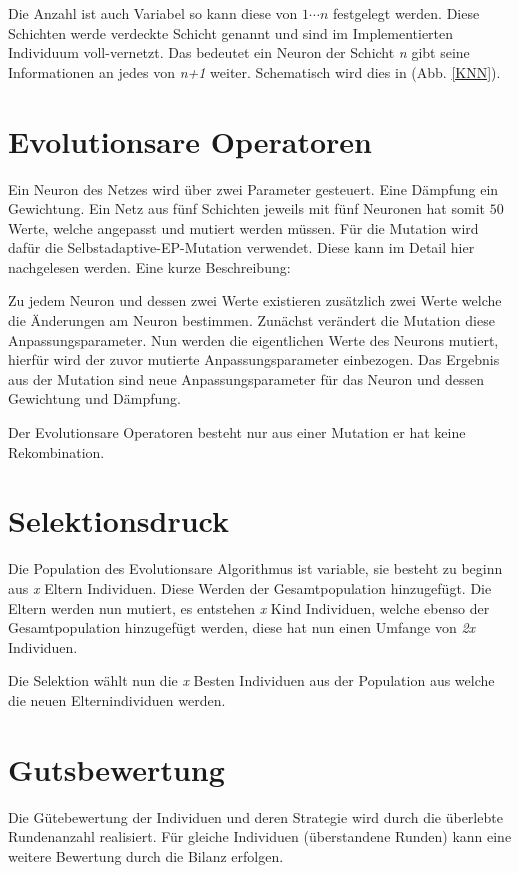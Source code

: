 Die Anzahl ist auch Variabel so kann diese von $1 \cdots n$ festgelegt werden. Diese Schichten werde verdeckte Schicht genannt und sind im Implementierten Individuum voll-vernetzt. Das bedeutet ein Neuron der Schicht \textit{n} gibt seine Informationen an jedes von \textit{n+1} weiter. Schematisch wird dies in (Abb. \ref{KNN}).

\section{Evolutionsare Operatoren}
Ein Neuron des Netzes wird über zwei Parameter gesteuert. Eine Dämpfung ein Gewichtung. Ein Netz aus fünf Schichten jeweils mit fünf Neuronen hat somit $50$ Werte, welche angepasst und mutiert werden müssen. Für die Mutation wird dafür die Selbstadaptive-EP-Mutation verwendet. Diese kann im Detail hier \citep[S.146]{Weicker2007} nachgelesen werden. Eine kurze Beschreibung:

Zu jedem Neuron und dessen zwei Werte existieren zusätzlich zwei Werte welche die Änderungen am Neuron bestimmen. Zunächst verändert die Mutation diese Anpassungsparameter. Nun werden die eigentlichen Werte des Neurons mutiert, hierfür wird der zuvor mutierte Anpassungsparameter einbezogen. Das Ergebnis aus der Mutation sind neue Anpassungsparameter für das Neuron und dessen Gewichtung und Dämpfung.

Der Evolutionsare Operatoren besteht nur aus einer Mutation er hat keine Rekombination.

\section{Selektionsdruck}
Die Population des Evolutionsare Algorithmus ist variable, sie besteht zu beginn aus \textit{x} Eltern Individuen. Diese Werden der Gesamtpopulation hinzugefügt. Die Eltern werden nun mutiert, es entstehen \textit{x} Kind Individuen, welche ebenso der Gesamtpopulation hinzugefügt werden, diese hat nun einen Umfange von \textit{2x} Individuen.

Die Selektion wählt nun die \textit{x} Besten Individuen aus der Population aus welche die neuen Elternindividuen werden.

\section{Gutsbewertung}
Die Gütebewertung der Individuen und deren Strategie wird durch die überlebte Rundenanzahl realisiert. Für gleiche Individuen (überstandene Runden) kann eine weitere Bewertung durch die Bilanz erfolgen.


